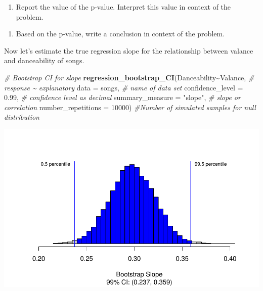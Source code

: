 \documentclass[
]{report}
\newenvironment{Shaded}{\begin{snugshade}}{\end{snugshade}}
\newcommand{\AttributeTok}[1]{\textcolor[rgb]{0.13,0.29,0.53}{#1}}
\newcommand{\CommentTok}[1]{\textcolor[rgb]{0.56,0.35,0.01}{\textit{#1}}}
\newcommand{\DecValTok}[1]{\textcolor[rgb]{0.00,0.00,0.81}{#1}}
\newcommand{\FloatTok}[1]{\textcolor[rgb]{0.00,0.00,0.81}{#1}}
\newcommand{\FunctionTok}[1]{\textcolor[rgb]{0.13,0.29,0.53}{\textbf{#1}}}
\newcommand{\NormalTok}[1]{#1}
\newcommand{\SpecialCharTok}[1]{\textcolor[rgb]{0.81,0.36,0.00}{\textbf{#1}}}
\newcommand{\StringTok}[1]{\textcolor[rgb]{0.31,0.60,0.02}{#1}}
\providecommand{\tightlist}{%
  \setlength{\itemsep}{0pt}\setlength{\parskip}{0pt}}
\begin{document}
\begin{enumerate}
\def\labelenumi{\arabic{enumi}.}
\setcounter{enumi}{6}
\tightlist
\item
  Report the value of the p-value. Interpret this value in context of the problem.
\end{enumerate}

\vspace{1in}

\begin{enumerate}
\def\labelenumi{\arabic{enumi}.}
\setcounter{enumi}{7}
\tightlist
\item
  Based on the p-value, write a conclusion in context of the problem.
\end{enumerate}

\vspace{1in}

Now let's estimate the true regression slope for the relationship between valance and danceability of songs.

\begin{Shaded}
\begin{Highlighting}[]
\CommentTok{\# Bootstrap CI for slope}
\FunctionTok{regression\_bootstrap\_CI}\NormalTok{(Danceability}\SpecialCharTok{\textasciitilde{}}\NormalTok{Valance, }\CommentTok{\# response \textasciitilde{} explanatory}
                        \AttributeTok{data =}\NormalTok{ songs, }\CommentTok{\# name of data set}
                        \AttributeTok{confidence\_level =} \FloatTok{0.99}\NormalTok{, }\CommentTok{\# confidence level as decimal}
                        \AttributeTok{summary\_measure =}  \StringTok{"slope"}\NormalTok{, }\CommentTok{\# slope or correlation}
                        \AttributeTok{number\_repetitions =} \DecValTok{10000}\NormalTok{) }\CommentTok{\#Number of simulated samples for null distribution}
\end{Highlighting}
\end{Shaded}

\begin{center}\includegraphics[width=0.7\linewidth]{14-UR-module13_review_files/figure-latex/unnamed-chunk-4-1} \end{center}
\end{document}

